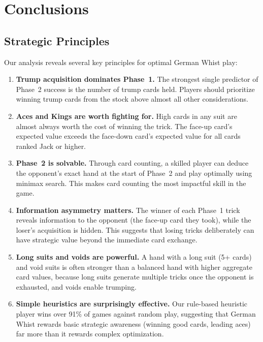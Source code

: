 \section{Conclusions}
\label{sec:conclusions}

\subsection{Strategic Principles}

Our analysis reveals several key principles for optimal German Whist play:

\begin{enumerate}
  \item \textbf{Trump acquisition dominates Phase~1.} The strongest single
    predictor of Phase~2 success is the number of trump cards held. Players
    should prioritize winning trump cards from the stock above almost all
    other considerations.

  \item \textbf{Aces and Kings are worth fighting for.} High cards in any
    suit are almost always worth the cost of winning the trick. The face-up
    card's expected value exceeds the face-down card's expected value for all
    cards ranked Jack or higher.

  \item \textbf{Phase~2 is solvable.} Through card counting, a skilled player
    can deduce the opponent's exact hand at the start of Phase~2 and play
    optimally using minimax search. This makes card counting the most
    impactful skill in the game.

  \item \textbf{Information asymmetry matters.} The winner of each Phase~1
    trick reveals information to the opponent (the face-up card they took),
    while the loser's acquisition is hidden. This suggests that losing
    tricks deliberately can have strategic value beyond the immediate card
    exchange.

  \item \textbf{Long suits and voids are powerful.} A hand with a long suit
    (5+ cards) and void suits is often stronger than a balanced hand with
    higher aggregate card values, because long suits generate multiple tricks
    once the opponent is exhausted, and voids enable trumping.

  \item \textbf{Simple heuristics are surprisingly effective.} Our
    rule-based heuristic player wins over 91\% of games against random play,
    suggesting that German Whist rewards basic strategic awareness
    (winning good cards, leading aces) far more than it rewards complex
    optimization.
\end{enumerate}


